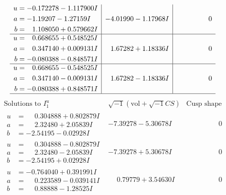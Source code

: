 \documentclass[1p]{elsarticle_modified}
\theoremstyle{definition}
\newcommand{\I}{\sqrt{-1}}
\begin{document}
$$\begin{array}{c|c|c}
\begin{aligned}
u &= -0.172278 - 1.117900 I \\
a &= -1.19207 - 1.27159 I \\
b &= \phantom{-}1.108050 + 0.579662 I\end{aligned}
 & -4.01990 - 1.17968 I & \phantom{-0.000000 } 0 \\ \hline\begin{aligned}
u &= \phantom{-}0.668655 + 0.548525 I \\
a &= \phantom{-}0.347140 + 0.009131 I \\
b &= -0.080388 - 0.848571 I\end{aligned}
 & \phantom{-}1.67282 + 1.18336 I & \phantom{-0.000000 } 0 \\ \hline\begin{aligned}
u &= \phantom{-}0.668655 - 0.548525 I \\
a &= \phantom{-}0.347140 - 0.009131 I \\
b &= -0.080388 + 0.848571 I\end{aligned}
 & \phantom{-}1.67282 - 1.18336 I & \phantom{-0.000000 } 0\\
 \hline 
 \end{array}$$\newpage$$\begin{array}{c|c|c}  
\text{Solutions to }I^u_{1}& \I (\text{vol} + \sqrt{-1}CS) & \text{Cusp shape}\\
 \hline 
\begin{aligned}
u &= \phantom{-}0.304888 + 0.802879 I \\
a &= \phantom{-}2.32480 + 2.05839 I \\
b &= -2.54195 - 0.02928 I\end{aligned}
 & -7.39278 - 5.30678 I & \phantom{-0.000000 } 0 \\ \hline\begin{aligned}
u &= \phantom{-}0.304888 - 0.802879 I \\
a &= \phantom{-}2.32480 - 2.05839 I \\
b &= -2.54195 + 0.02928 I\end{aligned}
 & -7.39278 + 5.30678 I & \phantom{-0.000000 } 0 \\ \hline\begin{aligned}
u &= -0.764040 + 0.391991 I \\
a &= \phantom{-}0.223589 - 0.039141 I \\
b &= \phantom{-}0.88888 - 1.28525 I\end{aligned}
 & \phantom{-}0.79779 + 3.54630 I & \phantom{-0.000000 } 0 \\ \hline\begin{aligned}

\end{aligned}
\end{array}$$
\end{document}
